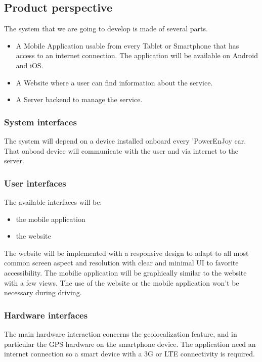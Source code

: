 \documentclass[english]{article}
\begin{document}
\subsection{Product perspective}
The system that we are going to develop is made of several parts. 
\begin{itemize}
	\item A Mobile Application usable from every Tablet or Smartphone that has access to an internet connection. The application will be available on Android and iOS. 
	\item A Website where a user can find information about the service.
	\item A Server backend to manage the service.
\end{itemize}

\subsubsection{System interfaces}
The system will depend on a device installed onboard every 'PowerEnJoy car. That onboad device will communicate with the user and via internet to the server.

\subsubsection{User interfaces}
The available interfaces will be:
\begin{itemize}
	\item the mobile application
	\item the website
\end{itemize}
The website will be implemented with a responsive design to adapt to all most common screen aspect and resolution with clear and minimal UI to favorite accessibility.
The mobilie application will be graphically similar to the website with a few views.
The use of the website or the mobile application won't be necessary during driving. 

\subsubsection{Hardware interfaces}
The main hardware interaction concerns the geolocalization feature, and in particular the GPS hardware on the smartphone device.
The application need an internet connection so a smart device with a 3G or LTE connectivity is required.
\end{document}
